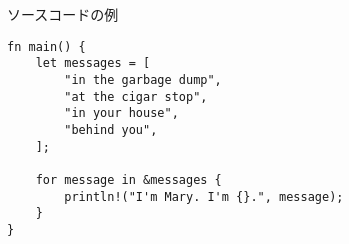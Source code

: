 \begin{frame}[fragile]{ソースコードの例}

    \begin{lstlisting}[caption={main.rs}]
fn main() {
    let messages = [
        "in the garbage dump",
        "at the cigar stop",
        "in your house",
        "behind you",
    ];

    for message in &messages {
        println!("I'm Mary. I'm {}.", message);
    }
}
\end{lstlisting}
\end{frame}
